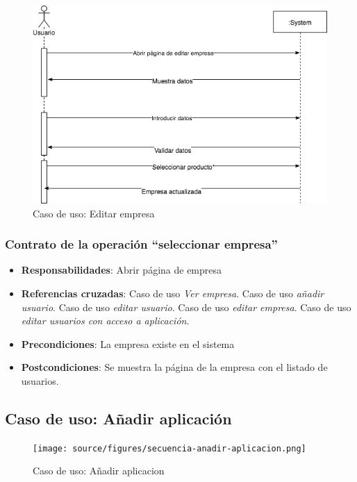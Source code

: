 \documentclass[12pt,a4paperpaper,]{report}
\providecommand{\tightlist}{%
  \setlength{\itemsep}{0pt}\setlength{\parskip}{0pt}}
\begin{document}
\begin{figure}
\centering
\includegraphics{source/figures/secuencia-editar-empresa.png}
\caption{Caso de uso: Editar empresa \label{secuencia_editar_empresa}}
\end{figure}

\subsubsection{\texorpdfstring{Contrato de la operación ``seleccionar
empresa''}{Contrato de la operación seleccionar empresa}}\label{contrato-de-la-operaciuxf3n-seleccionar-empresa}

\begin{itemize}
\tightlist
\item
  \textbf{Responsabilidades}: Abrir página de empresa
\item
  \textbf{Referencias cruzadas}: Caso de uso \emph{Ver empresa}. Caso de
  uso \emph{añadir usuario}. Caso de uso \emph{editar usuario}. Caso de
  uso \emph{editar empresa}. Caso de uso \emph{editar usuarios con
  acceso a aplicación}.
\item
  \textbf{Precondiciones}: La empresa existe en el sistema
\item
  \textbf{Postcondiciones}: Se muestra la página de la empresa con el
  listado de usuarios.
\end{itemize}

\subsection{Caso de uso: Añadir
aplicación}\label{caso-de-uso-auxf1adir-aplicaciuxf3n}

\begin{figure}
\centering
\texttt{[image: source/figures/secuencia-anadir-aplicacion.png]}
\caption{Caso de uso: Añadir aplicacion
\label{secuencia_anadir_aplicacion}}
\end{figure}
\end{document}
